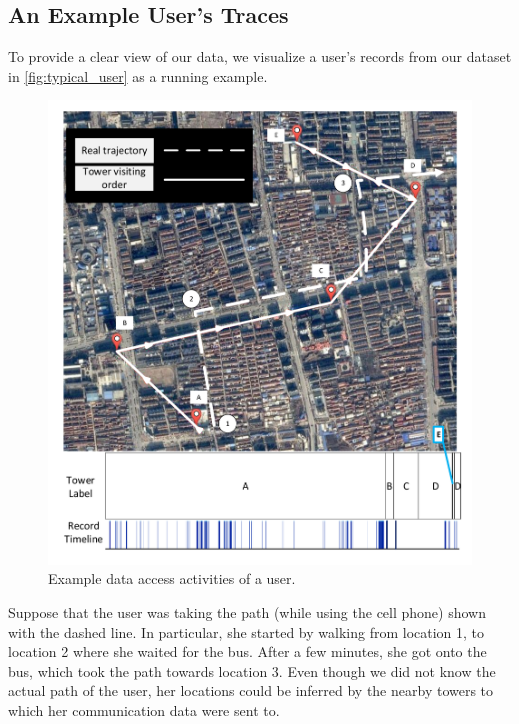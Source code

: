 \subsection{An Example User's Traces}

To provide a clear view of our data, we visualize a user's records from our dataset in \autoref{fig:typical_user} as a running example.

\begin{figure}[h]
    \centering
    \includegraphics[width=\linewidth]{./figures/typical_user.pdf}
    \vspace{-0.3in}
    \caption{Example data access activities of a user.}
    \label{fig:typical_user}
    \vspace{-0.1in}
\end{figure}

Suppose that the user was taking the path (while using the cell phone) shown with the dashed line.
In particular, she started by walking from location 1, to location 2 where she waited for the bus.
After a few minutes, she got onto the bus, which took the path towards location 3.
Even though we did not know the actual path of the user,
her locations could be inferred by the nearby towers to which her communication data were sent to.


